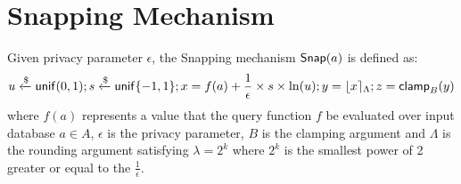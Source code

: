 \documentclass[a4paper,11pt]{article}
\begin{document}
\section{Snapping Mechanism}

\begin{defn}
Given privacy parameter $\epsilon$, the Snapping mechanism $\mathsf{Snap}(a)$ is defined as:
\[
	u \xleftarrow{\$} \mathsf{unif}(0,1); s \xleftarrow{\$} \mathsf{unif}\{-1, 1\};
	x = f(a) + \frac{1}{\epsilon} \times s \times \ln (u);
	y = \lfloor x \rceil_{\Lambda};
	z = \mathsf{clamp}_B (y)
\]
where $f(a)$ represents a value that the query function $f$ be evaluated over input database $a \in A$, $\epsilon$ is the privacy parameter, $B$ is the clamping argument and $\Lambda$ is the rounding argument satisfying $\lambda = 2^k$ where $2^k$ is the smallest power of 2 greater or equal to the $\frac{1}{\epsilon}$.
\end{defn}
%
\begin{thm}
\end{thm}
\end{document}
